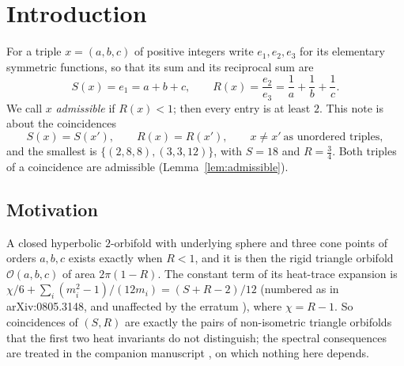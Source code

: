 \documentclass[11pt]{amsart}
\theoremstyle{definition}
\theoremstyle{remark}
\newcommand{\Orb}{\mathcal{O}}
\begin{document}
\maketitle

\section{Introduction}\label{sec:intro}

For a triple $x=(a,b,c)$ of positive integers write $e_1,e_2,e_3$ for its elementary symmetric functions, so that its sum and its reciprocal sum are
\[
  S(x)=e_1=a+b+c,\qquad R(x)=\frac{e_2}{e_3}=\frac1a+\frac1b+\frac1c .
\]
We call $x$ \emph{admissible} if $R(x)<1$; then every entry is at least $2$. This note is about the coincidences
\[
  S(x)=S(x'),\qquad R(x)=R(x'),\qquad x\ne x'\ \text{as unordered triples},
\]
and the smallest is $\{(2,8,8),(3,3,12)\}$, with $S=18$ and $R=\frac34$. Both triples of a coincidence are admissible (Lemma~\ref{lem:admissible}).

\subsection{Motivation}
A closed hyperbolic $2$-orbifold with underlying sphere and three cone points of orders $a,b,c$ exists exactly when $R<1$, and it is then the rigid triangle orbifold $\Orb(a,b,c)$ of area $2\pi(1-R)$. The constant term of its heat-trace expansion is $\chi/6+\sum_i(m_i^2-1)/(12m_i)=(S+R-2)/12$ \cite[Example~5.6, (5.7)]{dggw2008} (numbered as in arXiv:0805.3148, and unaffected by the erratum \cite{dggw2017}), where $\chi=R-1$. So coincidences of $(S,R)$ are exactly the pairs of non-isometric triangle orbifolds that the first two heat invariants do not distinguish; the spectral consequences are treated in the companion manuscript \cite{gangetal-heat}, on which nothing here depends.
\end{document}
